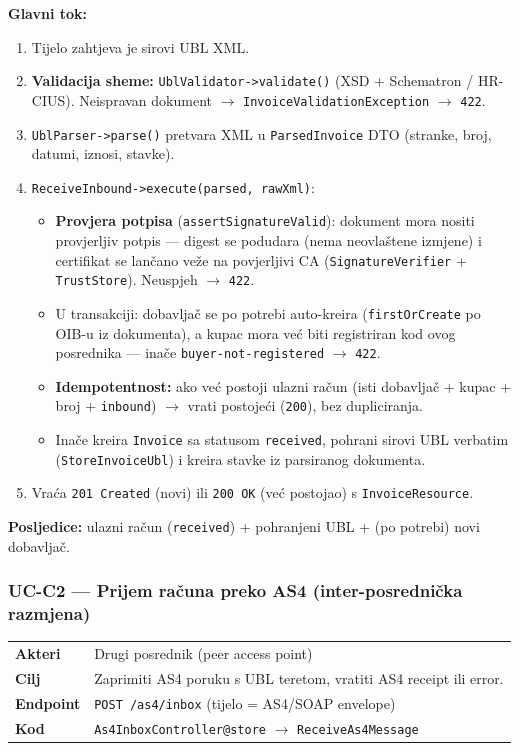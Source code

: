 \documentclass[11pt,a4paper]{article}
\begin{document}
\textbf{Glavni tok:}
\begin{enumerate}[nosep]
  \item Tijelo zahtjeva je sirovi UBL XML.
  \item \textbf{Validacija sheme:} \texttt{UblValidator->validate()} (XSD + Schematron / HR-CIUS). Neispravan
        dokument $\rightarrow$ \texttt{InvoiceValidationException} $\rightarrow$ \texttt{422}.
  \item \texttt{UblParser->parse()} pretvara XML u \texttt{ParsedInvoice} DTO (stranke, broj, datumi, iznosi, stavke).
  \item \texttt{ReceiveInbound->execute(parsed, rawXml)}:
    \begin{itemize}[nosep]
      \item \textbf{Provjera potpisa} (\texttt{assertSignatureValid}): dokument mora nositi provjerljiv
            potpis — digest se podudara (nema neovlaštene izmjene) i certifikat se lančano veže
            na povjerljivi CA (\texttt{SignatureVerifier} + \texttt{TrustStore}). Neuspjeh $\rightarrow$ \texttt{422}.
      \item U transakciji: dobavljač se po potrebi auto-kreira (\texttt{firstOrCreate} po OIB-u iz
            dokumenta), a kupac mora već biti registriran kod ovog posrednika — inače
            \texttt{buyer-not-registered} $\rightarrow$ \texttt{422}.
      \item \textbf{Idempotentnost:} ako već postoji ulazni račun (isti dobavljač + kupac + broj +
            \texttt{inbound}) $\rightarrow$ vrati postojeći (\texttt{200}), bez dupliciranja.
      \item Inače kreira \texttt{Invoice} sa statusom \texttt{received}, pohrani sirovi UBL verbatim
            (\texttt{StoreInvoiceUbl}) i kreira stavke iz parsiranog dokumenta.
    \end{itemize}
  \item Vraća \texttt{201 Created} (novi) ili \texttt{200 OK} (već postojao) s \texttt{InvoiceResource}.
\end{enumerate}

\textbf{Posljedice:} ulazni račun (\texttt{received}) + pohranjeni UBL + (po potrebi) novi dobavljač.

\subsubsection{UC-C2 — Prijem računa preko AS4 (inter-posrednička razmjena)}

\begin{tabularx}{\textwidth}{@{}lY@{}}
\toprule
\textbf{Akteri} & Drugi posrednik (peer access point) \\
\textbf{Cilj} & Zaprimiti AS4 poruku s UBL teretom, vratiti AS4 receipt ili error. \\
\textbf{Endpoint} & \texttt{POST /as4/inbox} (tijelo = AS4/SOAP envelope) \\
\textbf{Kod} & \texttt{As4InboxController@store} $\rightarrow$ \texttt{ReceiveAs4Message} \\
\bottomrule
\end{tabularx}
\end{document}
